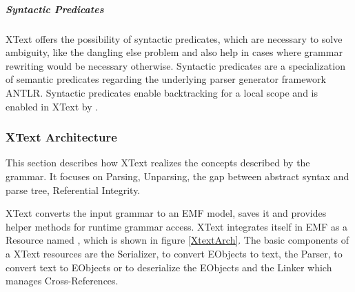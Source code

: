 \subparagraph{Syntactic Predicates}
XText offers the possibility of syntactic predicates, which are necessary to solve ambiguity, like the dangling else problem and also help in cases where grammar rewriting would be necessary otherwise. Syntactic predicates are a specialization of semantic predicates regarding the underlying parser generator framework ANTLR. Syntactic predicates enable backtracking for a local scope and is enabled in XText by \code{=>}.






\subsubsection{XText Architecture}
\label{cha:xtextarch}
This section describes how XText realizes the concepts described by the grammar. It focuses on Parsing, Unparsing, the gap between abstract syntax and parse tree, Referential Integrity. 

XText converts the input grammar to an EMF model, saves it and provides helper methods for runtime grammar access. XText integrates itself in EMF as a Resource named , which is shown in figure \ref{XtextArch}.  The basic components of a XText resources are the Serializer, to convert EObjects to text, the Parser, to convert text to EObjects or to deserialize the EObjects and the Linker which manages Cross-References. 

